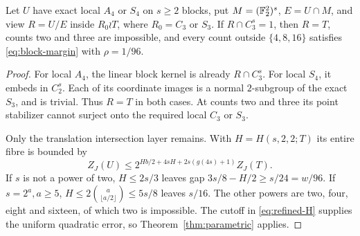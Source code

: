 \begin{theorem}
\label{thm:zero-ternary-capacity}
Let $U$ have exact local $A_4$ or $S_4$ on $s\geq2$ blocks, put
$M=(\mathbb F_2^2)^s$, $E=U\cap M$, and view $R=U/E$ inside
$R_0\wr T$, where $R_0=C_3$ or $S_3$. If $R\cap C_3^s=1$,
then $R=T$, counts two and three are impossible, and every count
outside $\{4,8,16\}$ satisfies \eqref{eq:block-margin} with
$\rho=1/96$.
\end{theorem}
\begin{proof}
For local $A_4$, the linear block kernel is already $R\cap C_3^s$.
For local $S_4$, it embeds in $C_2^s$. Each of its coordinate images
is a normal $2$-subgroup of the exact $S_3$, and is trivial. Thus
$R=T$ in both cases. At counts two and three its point stabilizer
cannot surject onto the required local $C_3$ or $S_3$.

Only the translation intersection layer remains. With
$H=H(s,2,2;T)$ its entire fibre is bounded by
\[
 Z_J(U)\leq2^{Hb/2+4sH+2s(g(4s)+1)}Z_J(T).
\]
If $s$ is not a power of two, $H\leq2s/3$ leaves gap
$3s/8-H/2\geq s/24=w/96$. If $s=2^a,a\geq5$,
$H\leq2\binom a{\lfloor a/2\rfloor}\leq5s/8$ leaves $s/16$.
The other powers are two, four, eight and sixteen, of which two is
impossible. The cutoff in \eqref{eq:refined-H} supplies the uniform
quadratic error, so Theorem~\ref{thm:parametric} applies.
\end{proof}
